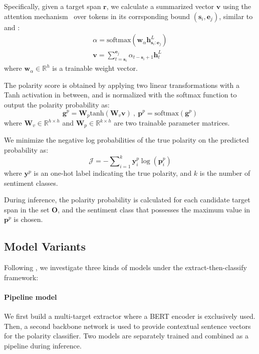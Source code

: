 \documentclass[11pt,a4paper]{article}
\begin{document}
Specifically, given a target span $\mathbf{r}$, we calculate a summarized vector $\mathbf{v}$ using the attention mechanism~\cite{bahdanau2014neural} over tokens in its corrsponding bound $(\mathbf{s}_i, \mathbf{e}_j)$, similar to \citet{lee2017end} and \citet{he2018jointly}:
\begin{gather}
\alpha = \mathrm{softmax}(\mathbf{w}_{\alpha} \mathbf{h}^L_{\mathbf{s}_i:\mathbf{e}_j}) \nonumber \\
\mathbf{v} = \sum\nolimits_{t=\mathbf{s}_i}^{\mathbf{e}_j} {\alpha_{t-\mathbf{s}_i+1}} \mathbf{h}_t^L  \nonumber
\end{gather}
where $\mathbf{w}_{\alpha} \in\mathbb{R}^{h}$ is a trainable weight vector.

The polarity score is obtained by applying two linear transformations with a Tanh activation in between, and is normalized with the softmax function to output the polarity probability as:
\begin{equation} 
	\mathbf{g}^p = \mathbf{W}_{p} \mathrm{tanh}(\mathbf{W}_{v}  \mathbf{v}) \ , \  \mathbf{p}^p = \mathrm{softmax}(\mathbf{g}^p)  \nonumber
\end{equation}
where $\mathbf{W}_{v} \in\mathbb{R}^{h \times h}$ and $\mathbf{W}_{p} \in\mathbb{R}^{k \times h}$ are two trainable parameter matrices.

We minimize the negative log probabilities of the true polarity on the predicted probability as:
\begin{equation} 
	\mathcal{J} = - \sum\nolimits_{i=1}^{k} \mathbf{y}^p_i \log ( \mathbf{p}^p_i )	\nonumber
\end{equation}
where $\mathbf{y}^p$ is an one-hot label indicating the true polarity, and $k$ is the number of sentiment classes.

During inference, the polarity probability is calculated for each candidate target span in the set $\mathbf{O}$, and the sentiment class that possesses the maximum value in $\mathbf{p}^p$ is chosen.

\subsection{Model Variants		\label{sec:models}}
Following \citet{mitchell2013open,zhang2015neural}, we investigate three kinds of models under the extract-then-classify framework:

\paragraph{Pipeline model}
We first build a multi-target extractor where a BERT encoder is exclusively used. 
Then, a second backbone network is used to provide contextual sentence vectors for the polarity classifier.
Two models are separately trained and combined as a pipeline during inference.
\end{document}
